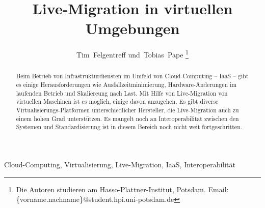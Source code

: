 \title{Live-Migration in virtuellen Umgebungen
}
\author{Tim~Felgentreff und~Tobias~Pape%
\thanks{%
  Die Autoren studieren am
  Hasso-Plattner-Institut, Potsdam.\goodbreak
  Email: \{vorname.nachname\}@student.hpi.uni-potsdam.de}%
}

\maketitle

\onlydraft{\tableofcontents}

\begin{abstract}
Beim Betrieb von Infrastrukturdiensten im Umfeld von Cloud-Computing
-- \acf{IaaS} -- gibt es
einige Herausforderungen wie Ausfallzeitminimierung,
Hardware-Änderungen im laufenden Betrieb und Skaliereung nach Last.
Mit Hilfe von Live-Migration von virtuellen Maschinen ist es möglich,
einige davon anzugehen. Es gibt diverse
Virtualisierungs-Platformen unterschiedlicher Hersteller, die
Live-Migration auch zu einem hohen Grad unterstützen. Es mangelt noch
an Interoperabilität zwischen den Systemen und Standardisierung ist
in diesem Bereich noch nicht weit fortgeschritten.
\end{abstract}

\begin{IEEEkeywords}
  Cloud-Computing, Virtualisierung, Live-Migration, IaaS, Interoperabilität
\end{IEEEkeywords}
\IEEEpeerreviewmaketitle

